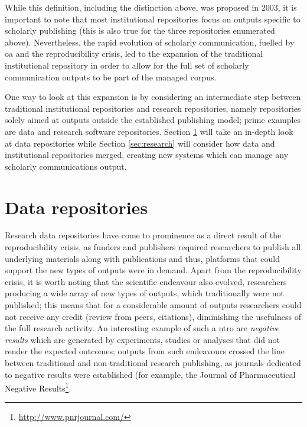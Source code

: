 While this definition, including the distinction above, was proposed in 2003, it is important to note that most institutional repositories focus on outputs specific to scholarly publishing (this is also true for the three repositories enumerated above). Nevertheless, the rapid evolution of scholarly communication, fuelled by \gls{oa} and the reproducibility crisis, led to the expansion of the traditional institutional repository in order to allow for the full set of scholarly communication outputs to be part of the managed corpus.

One way to look at this expansion is by considering an intermediate step between traditional institutional repositories and research repositories, namely repositories solely aimed at outputs outside the established publishing model; prime examples are data and research software repositories. Section \ref{sec:data} will take an in-depth look at data repositories while Section \ref{sec:research} will consider how data and institutional repositories merged, creating new systems which can manage any scholarly communications output.


\section{Data repositories}
\label{sec:data}

Research data repositories have come to prominence as a direct result of the reproducibility crisis, as funders and publishers required researchers to publish all underlying materials along with publications and thus, platforms that could support the new types of outputs were in demand. Apart from the reproducibility crisis, it is worth noting that the scientific endeavour also evolved, researchers producing a wide array of new types of outputs, which traditionally were not published; this means that for a considerable amount of outputs researchers could not receive any credit (review from peers, citations), diminishing the usefulness of the full research activity. An interesting example of such a \gls{ntro} are \emph{negative results} which are generated by experiments, studies or analyses that did not render the expected outcomes; outputs from such endeavours crossed the line between traditional and non-traditional research publishing, as journals dedicated to negative results were established (for example, the Journal of Pharmaceutical Negative Results\footnote{\url{http://www.pnrjournal.com/}}.

